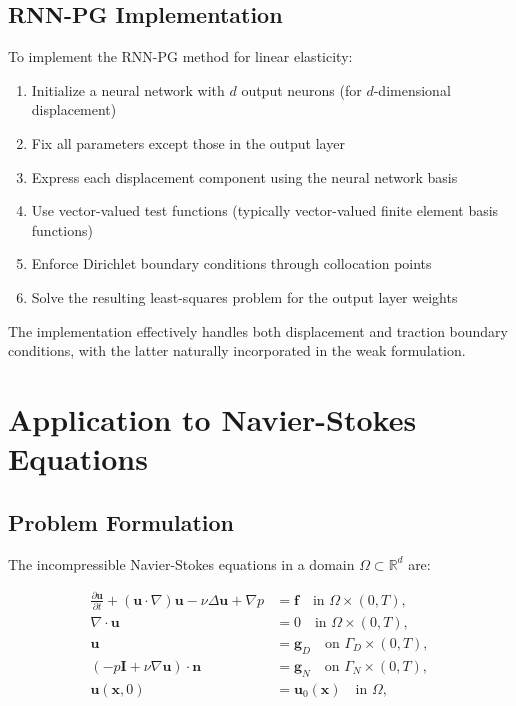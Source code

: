 \documentclass[11pt,a4paper]{article}
\begin{document}
\subsection{RNN-PG Implementation}

To implement the RNN-PG method for linear elasticity:

\begin{enumerate}
    \item Initialize a neural network with $d$ output neurons (for $d$-dimensional displacement)
    \item Fix all parameters except those in the output layer
    \item Express each displacement component using the neural network basis
    \item Use vector-valued test functions (typically vector-valued finite element basis functions)
    \item Enforce Dirichlet boundary conditions through collocation points
    \item Solve the resulting least-squares problem for the output layer weights
\end{enumerate}

The implementation effectively handles both displacement and traction boundary conditions, with the latter naturally incorporated in the weak formulation.

\section{Application to Navier-Stokes Equations}

\subsection{Problem Formulation}

The incompressible Navier-Stokes equations in a domain $\Omega \subset \mathbb{R}^d$ are:

\begin{align}
\frac{\partial \mathbf{u}}{\partial t} + (\mathbf{u} \cdot \nabla) \mathbf{u} - \nu \Delta \mathbf{u} + \nabla p &= \mathbf{f} \quad \text{in } \Omega \times (0,T), \\
\nabla \cdot \mathbf{u} &= 0 \quad \text{in } \Omega \times (0,T), \\
\mathbf{u} &= \mathbf{g}_D \quad \text{on } \Gamma_D \times (0,T), \\
(-p \mathbf{I} + \nu \nabla \mathbf{u}) \cdot \mathbf{n} &= \mathbf{g}_N \quad \text{on } \Gamma_N \times (0,T), \\
\mathbf{u}(\mathbf{x}, 0) &= \mathbf{u}_0(\mathbf{x}) \quad \text{in } \Omega,
\end{align}
\end{document}
